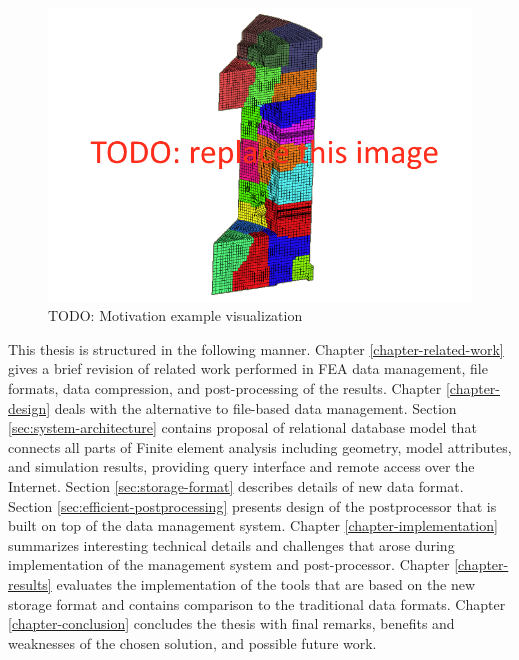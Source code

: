 \begin{figure}[H]
\centering
\includegraphics[width=\textwidth]{figures/motivation-example}
\decoRule
\caption[TODO: ]{TODO: Motivation example visualization}
\label{fig:motivation-example}
\end{figure}

This thesis is structured in the following manner. Chapter \ref{chapter-related-work} gives a brief revision of related work performed in FEA data management, file formats, data compression, and post-processing of the results. Chapter \ref{chapter-design} deals with the alternative to file-based data management. Section \ref{sec:system-architecture} contains proposal of relational database model that connects all parts of Finite element analysis including geometry, model attributes, and simulation results, providing query interface and remote access over the Internet. Section \ref{sec:storage-format} describes details of new data format. Section \ref{sec:efficient-postprocessing} presents design of the postprocessor that is built on top of the data management system. Chapter \ref{chapter-implementation} summarizes interesting technical details and challenges that arose during implementation of the management system and post-processor. Chapter \ref{chapter-results} evaluates the implementation of the tools that are based on the new storage format and contains comparison to the traditional data formats. Chapter \ref{chapter-conclusion} concludes the thesis with final remarks, benefits and weaknesses of the chosen solution, and possible future work.


